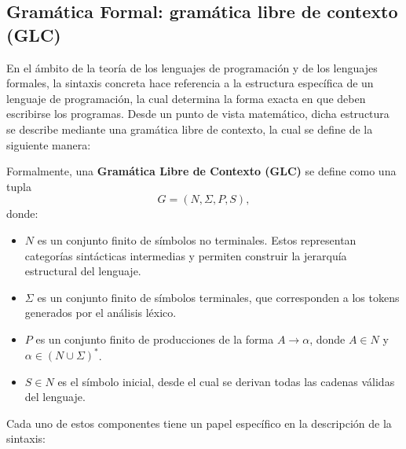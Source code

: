 \documentclass[a4paper,12pt]{article}
\begin{document}
\subsection{Gramática Formal: gramática libre de contexto (GLC)}

  En el ámbito de la teoría de los lenguajes de programación y de los lenguajes formales, la sintaxis concreta hace referencia a la estructura específica de un lenguaje de programación, la cual determina la forma exacta en que deben escribirse los programas. Desde un punto de vista matemático, dicha estructura se describe mediante una gramática libre de contexto, la cual se define de la siguiente manera:

\begin{tcolorbox}[title=Definición: Gramática libre de contexto, breakable]
Formalmente, una \textbf{Gramática Libre de Contexto (GLC)} se define como una tupla 
\[
G = (N, \Sigma, P, S),
\]
donde:
\begin{itemize}
    \item $N$ es un conjunto finito de símbolos no terminales. Estos representan categorías sintácticas intermedias y permiten construir la jerarquía estructural del lenguaje.
    \item $\Sigma$ es un conjunto finito de símbolos terminales, que corresponden a los tokens generados por el análisis léxico.
    \item $P$ es un conjunto finito de producciones de la forma $A \rightarrow \alpha$, donde $A \in N$ y $\alpha \in (N \cup \Sigma)^{*}$.
    \item $S \in N$ es el símbolo inicial, desde el cual se derivan todas las cadenas válidas del lenguaje.\cite{UNAMTesis,OpenStax,LDPnota3}
\end{itemize}

\end{tcolorbox}

Cada uno de estos componentes tiene un papel específico en la descripción de la sintaxis:
\end{document}
